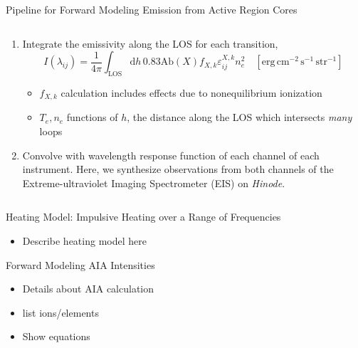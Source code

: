 \documentclass[final]{beamer}
\begin{document}
\begin{frame}
\begin{columns}[T]
\begin{column}{0.49\linewidth}
\begin{block}{Pipeline for Forward Modeling Emission from Active Region Cores}
\begin{columns}[T]
\begin{column}{0.59\columnwidth}
\begin{enumerate}
\begin{equation*}
            \end{equation*}
            where all atomic data comes from the CHIANTI atomic database \citep{young_chianti_2016,dere_chianti_1997}
          \item Integrate the emissivity along the LOS for each transition,
            \begin{equation*}
              I(\lambda_{ij}) = \frac{1}{4\pi}\int_{\mathrm{LOS}}\mathrm{d}h\,0.83\mathrm{Ab}(X)f_{X,k}\varepsilon_{ij}^{X,k}n_e^2 \quad [\mathrm{erg}\,\mathrm{cm}^{-2}\,\mathrm{s}^{-1}\,\mathrm{str}^{-1}]
            \end{equation*}
            \begin{itemize}
              \item $f_{X,k}$ calculation includes effects due to nonequilibrium ionization \citep[e.g.][]{bradshaw_numerical_2009,bradshaw_what_2011}
              \item $T_e,n_e$ functions of $h$, the distance along the LOS which intersects \textit{many} loops
            \end{itemize}
          \item Convolve with wavelength response function of each channel of each instrument. Here, we synthesize observations from both channels of the Extreme-ultraviolet Imaging Spectrometer (EIS) on \textit{Hinode}.
        \end{enumerate}
      \end{column}
      \end{columns}
    \end{block}
    \begin{block}{Heating Model: Impulsive Heating over a Range of Frequencies}
      \begin{itemize}
        \item Describe heating model here
      \end{itemize}
    \end{block}
    \begin{block}{Forward Modeling AIA Intensities}
      \begin{itemize}
        \item Details about AIA calculation
        \item list ions/elements
        \item Show equations
      \end{itemize}
    \end{block}

\end{column}
\end{columns}
\end{frame}
\end{document}
